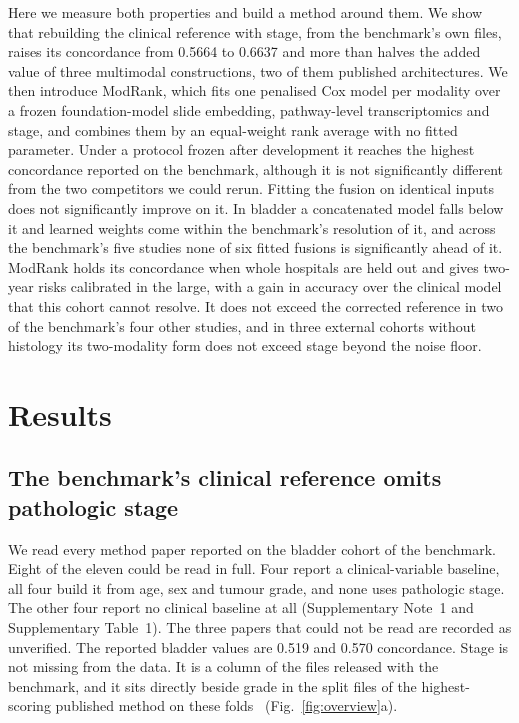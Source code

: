 \documentclass[pdflatex,sn-nature]{sn-jnl}
\begin{document}
Here we measure both properties and build a method around them. We show that rebuilding the
clinical reference with stage, from the benchmark's own files, raises its concordance from 0.5664 to
0.6637 and more than halves the added value of three multimodal constructions, two of them published
architectures. We then
introduce ModRank, which fits one penalised Cox model per modality over a frozen foundation-model
slide embedding, pathway-level transcriptomics and stage, and combines them by an equal-weight rank
average with no fitted parameter. Under a protocol frozen after development it reaches the highest concordance
reported on the benchmark, although it is not significantly different from the two competitors we
could rerun. Fitting the fusion on identical inputs does not significantly improve on it. In bladder a
concatenated model falls below it and learned weights come within the benchmark's resolution of it,
and across the benchmark's five studies none of six fitted fusions is significantly ahead of it. ModRank
holds its concordance when whole hospitals are held out and gives two-year risks calibrated in the
large, with a
gain in accuracy over the clinical model that this cohort cannot resolve. It does not exceed the
corrected reference in two of the benchmark's four other studies, and in three external cohorts
without histology its two-modality form does not exceed stage beyond the noise floor.

\section*{Results}

\subsection*{The benchmark's clinical reference omits pathologic stage}

We read every method paper reported on the bladder cohort of the benchmark. Eight of the eleven
could be read in full. Four report a clinical-variable baseline, all four build it from age, sex and
tumour grade, and none uses pathologic stage. The other four report no clinical baseline at all
(Supplementary Note~1 and Supplementary Table~1). The three papers that could not be read are
recorded as unverified. The reported bladder values are 0.519 and 0.570 concordance. Stage is not missing from
the data. It is a column of the files released with the benchmark, and it sits directly beside grade
in the split files of the highest-scoring published method on these folds~\citep{eijpe2025dimaf} (Fig.~\ref{fig:overview}a).
\end{document}
